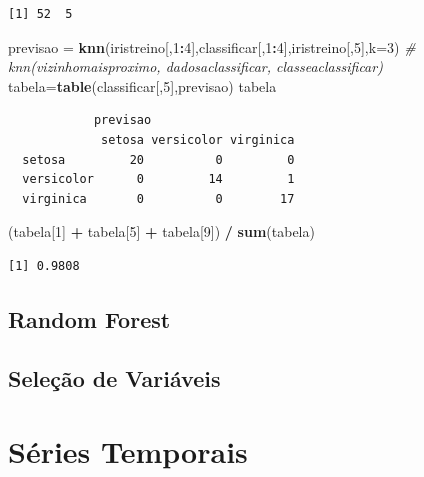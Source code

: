 \documentclass[12pt,brazil,oneside]{book}
\newenvironment{Shaded}{\begin{snugshade}}{\end{snugshade}}
\newcommand{\CommentTok}[1]{\textcolor[rgb]{0.56,0.35,0.01}{\textit{#1}}}
\newcommand{\DataTypeTok}[1]{\textcolor[rgb]{0.13,0.29,0.53}{#1}}
\newcommand{\DecValTok}[1]{\textcolor[rgb]{0.00,0.00,0.81}{#1}}
\newcommand{\KeywordTok}[1]{\textcolor[rgb]{0.13,0.29,0.53}{\textbf{#1}}}
\newcommand{\NormalTok}[1]{#1}
\newcommand{\OperatorTok}[1]{\textcolor[rgb]{0.81,0.36,0.00}{\textbf{#1}}}
\newcommand{\StringTok}[1]{\textcolor[rgb]{0.31,0.60,0.02}{#1}}
\begin{document}
\begin{verbatim}
[1] 52  5
\end{verbatim}

\begin{Shaded}
\begin{Highlighting}[]
\NormalTok{previsao =}\StringTok{ }\KeywordTok{knn}\NormalTok{(iristreino[,}\DecValTok{1}\OperatorTok{:}\DecValTok{4}\NormalTok{],classificar[,}\DecValTok{1}\OperatorTok{:}\DecValTok{4}\NormalTok{],iristreino[,}\DecValTok{5}\NormalTok{],}\DataTypeTok{k=}\DecValTok{3}\NormalTok{)}
\CommentTok{# knn(vizinhomaisproximo, dadosaclassificar, classeaclassificar)}
\NormalTok{tabela=}\KeywordTok{table}\NormalTok{(classificar[,}\DecValTok{5}\NormalTok{],previsao)}
\NormalTok{tabela}
\end{Highlighting}
\end{Shaded}

\begin{verbatim}
            previsao
             setosa versicolor virginica
  setosa         20          0         0
  versicolor      0         14         1
  virginica       0          0        17
\end{verbatim}

\begin{Shaded}
\begin{Highlighting}[]
\NormalTok{(tabela[}\DecValTok{1}\NormalTok{] }\OperatorTok{+}\StringTok{ }\NormalTok{tabela[}\DecValTok{5}\NormalTok{] }\OperatorTok{+}\StringTok{ }\NormalTok{tabela[}\DecValTok{9}\NormalTok{]) }\OperatorTok{/}\StringTok{ }\KeywordTok{sum}\NormalTok{(tabela) }
\end{Highlighting}
\end{Shaded}

\begin{verbatim}
[1] 0.9808
\end{verbatim}

\hypertarget{random-forest}{%
\section{Random Forest}\label{random-forest}}

\hypertarget{selecao-de-variaveis}{%
\section{Seleção de Variáveis}\label{selecao-de-variaveis}}

\hypertarget{series-temporais}{%
\chapter{Séries Temporais}\label{series-temporais}}
\end{document}

